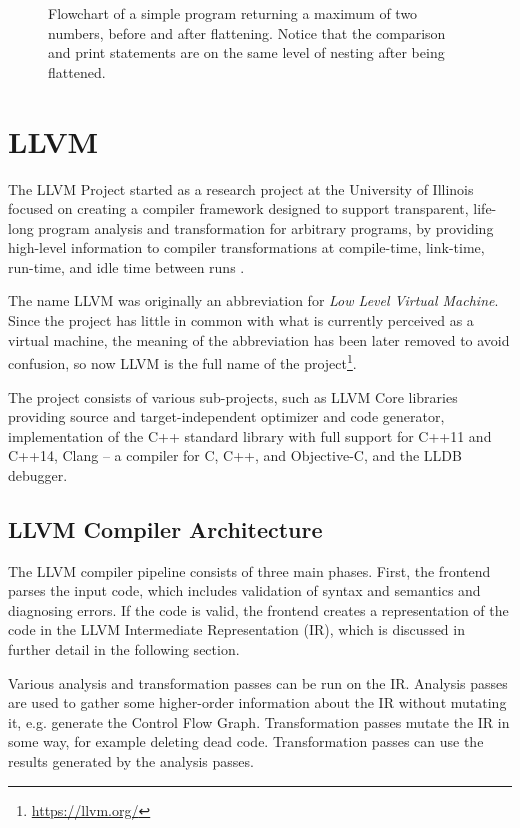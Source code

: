 \documentclass[
  digital, %
  table,   %
  twoside, %
  nolof,     %
  nolot,     %
]{fithesis3}
\theoremstyle{definition}
\begin{document}
\begin{figure}
\begin{center}
\begin{minipage}{.6\textwidth}
        \end{minipage}
    \end{center}
    \caption{Flowchart of a simple program returning a maximum of two numbers, before and after flattening. Notice that the comparison and print statements are on the same level of nesting after being flattened.}
    \label{fig:flattening}
\end{figure}



\chapter{LLVM}

The LLVM Project started as a research project at the University of Illinois focused on creating a compiler framework designed to support transparent, life-long program analysis and transformation for arbitrary programs, by providing high-level information to compiler transformations at compile-time, link-time, run-time, and idle time between runs \cite{llvm_orig}. 

The name LLVM was originally an abbreviation for \textit{Low Level Virtual Machine}. Since the project has little in common with what is currently perceived as a virtual machine, the meaning of the abbreviation has been later removed to avoid confusion, so now LLVM is the full name of the project\footnote{\url{https://llvm.org/}}.

The project consists of various sub-projects, such as LLVM Core libraries providing source and target-independent optimizer and code generator, implementation of the C++ standard library with full support for C++11 and C++14, Clang -- a compiler for C, C++, and Objective-C, and the LLDB debugger.

\section{LLVM Compiler Architecture}
The LLVM compiler pipeline consists of three main phases. First, the frontend parses the input code, which includes validation of syntax and semantics and diagnosing errors. If the code is valid, the frontend creates a representation of the code in the LLVM Intermediate Representation (IR), which is discussed in further detail in the following section. 

Various analysis and transformation passes can be run on the IR. Analysis passes are used to gather some higher-order information about the IR without mutating it, e.g. generate the Control Flow Graph. Transformation passes mutate the IR in some way, for example deleting dead code. Transformation passes can use the results generated by the analysis passes. 
\end{document}
